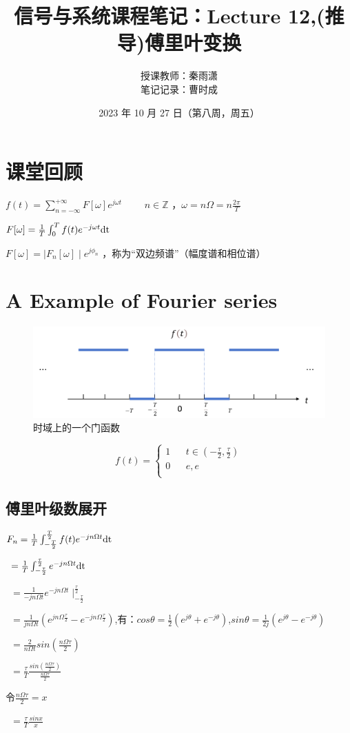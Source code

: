 \documentclass[UTF8]{ctexart}
\begin{document}
\title{信号与系统课程笔记：Lecture 12,(推导)傅里叶变换}
\author{授课教师：秦雨潇 \\
        笔记记录：曹时成}
\date{2023 年 10 月 27 日（第八周，周五）}
\maketitle

\section{课堂回顾}
$f(t)=\sum_{n=-\infty}^{+\infty}F[\omega]e^{j\omega{t}}\qquad$ $n\in \mathbb{Z}$ ，$\omega=n\Omega=n\frac{2\pi}{T}  $ \par
$F[\omega]=\frac{1}{T}\int_{0}^{T}f(t)e^{-j\omega{t}}{\rm{dt}}$ \par
$F[\omega]=\mid F_n[\omega]\mid e^{j\phi _n}$ ，称为“双边频谱”（幅度谱和相位谱）
\section{A Example of Fourier series}
\begin{figure}[h]
    \centering         %
    \includegraphics[scale=0.5]{1.jpg}
    \caption{时域上的一个门函数}
\end{figure}
\[  f(t) =\left\{ \begin{array}{rcl}
    1 & & {t\in (-\frac{\tau }{2} ,\frac{\tau }{2} )}\\
    0 & & {e,e}\\
    \end{array} \right. \]
\subsection{傅里叶级数展开}
$F_n=\frac{1}{T}\int_{-\frac{T }{2}}^{\frac{T}{2}}f(t)e^{-jn\Omega{t}}{\rm{dt}}$ \par
\quad \, $=\frac{1}{T}\int_{-\frac{\tau }{2}}^{\frac{\tau }{2}}e^{-jn\Omega{t}}{\rm{dt}}$\par
\quad \, $=\frac{1}{-jn\Omega{t}} e^{-jn\Omega{t}}\mid_{-\frac{\tau }{2}}^{\frac{\tau }{2}}$\par
\quad \, $=\frac{1}{jn\Omega{t}}(e^{jn\Omega{\frac{\tau }{2}}}-e^{-jn\Omega{\frac{\tau }{2}}})$,有：$cos\theta =\frac{1}{2}(e^{j\theta }+e^{-j\theta })$,$sin\theta =\frac{1}{2j}(e^{j\theta }-e^{-j\theta })$\par
\quad \, $=\frac{2}{n\Omega{t}}sin(\frac{n\Omega\tau }{2} )$\par
\quad \, $=\frac{\tau }{T}\frac{sin(\frac{n\Omega\tau }{2})}{\frac{n\Omega\tau }{2}}  $\par
令$\frac{n\Omega\tau }{2}=x$\par
\quad \, $=\frac{\tau }{T}\frac{sinx}{x}$\par
\end{document}
